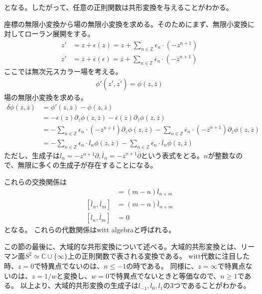 \documentclass[11pt, dvipdfmx]{article}
\numberwithin{equation}{section}
\newcommand{\blankline}{\par\vspace{\baselineskip}} %
\begin{document}
となる。したがって、任意の正則関数は共形変換を与えることがわかる。
\blankline
座標の無限小変換から場の無限小変換を求める。そのためにまず、無限小変換に対してローラン展開をする。
\begin{align}
    z' &= z + \epsilon(z)=z+\sum_{n\in \mathbb{Z}}\epsilon_n\cdot(-z^{n+1})\\
    \overline{z'}&=\overline{z}+\overline{\epsilon}(\epsilon)=\overline{z}+\sum_{n\in \mathbb{Z}}\overline{\epsilon}_n\cdot(-\overline{z}^{n+1})
\end{align}
ここでは無次元スカラー場を考える。
\begin{align}
    \phi'(z',\overline{z'})=\phi(z,\overline{z})
\end{align}
場の無限小変換を求める。
\begin{align}
    \delta \phi(z,\overline{z}) &= \phi'(z,\overline{z}) - \phi(z,\overline{z})\\
    &= -\epsilon(z)\partial_z \phi(z,\overline{z}) - \overline{\epsilon}(\overline{z})\partial_{\overline{z}} \phi(z,\overline{z})\\
    &= -\sum_{n\in \mathbb{Z}}\epsilon_n\cdot(-z^{n+1})\partial_z \phi(z,\overline{z}) - \sum_{n\in \mathbb{Z}}\overline{\epsilon}_n\cdot(-\overline{z}^{n+1})\partial_{\overline{z}} \phi(z,\overline{z})\\
    &= -\sum_{n\in \mathbb{Z}}\epsilon_n\cdot l_n \phi(z,\overline{z}) - \sum_{n\in \mathbb{Z}}\overline{\epsilon}_n\cdot \overline{l}_n \phi(z,\overline{z})  
\end{align}
ただし、生成子は$l_n=-z^{n+1}\partial,\overline{l}_n=-\overline{z}^{n+1}\overline{\partial}$という表式をとる。$n$が整数なので、無限に多くの生成子が存在することになる。
\blankline
これらの交換関係は
\begin{align}
    [l_n,l_m] 
    &= (m-n)l_{n+m}\\
    [\overline{l}_n,\overline{l}_m] 
    &= (m-n)\overline{l}_{n+m}\\
    [l_n,\overline{l}_m] &= 0
\end{align}
となる。
これらの代数関係はwitt algebraと呼ばれる。
\blankline

この節の最後に、大域的な共形変換について述べる。大域的共形変換とは、リーマン面$S^2\simeq \mathbb{C}\cup \{\infty\}$上の正則関数で表される変換である。
witt代数に注目した時、$z=0$で特異点でないのは、$n\leq-1$の時である。
同様に、$z=\infty$で特異点ないのは、$z=1/w$と変換し、$w=0$で特異点でないときと等価なので、$n\geq1$である。
以上より、大域的共形変換の生成子は$l_{-1},l_0,l_1$の3つであることがわかる。
\end{document}

